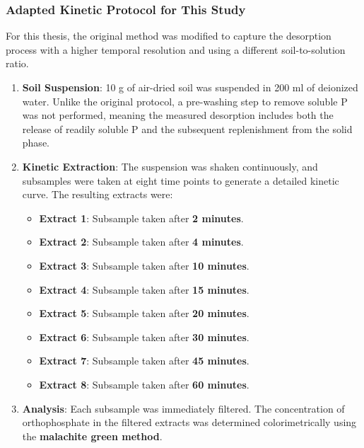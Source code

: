 \documentclass[
  letterpaper,
  DIV=11,
  numbers=noendperiod]{scrartcl}
\providecommand{\tightlist}{%
  \setlength{\itemsep}{0pt}\setlength{\parskip}{0pt}}\usepackage{longtable,booktabs,array}
\begin{document}
\subsubsection{Adapted Kinetic Protocol for This
Study}\label{adapted-kinetic-protocol-for-this-study}

For this thesis, the original method was modified to capture the
desorption process with a higher temporal resolution and using a
different soil-to-solution ratio.

\begin{enumerate}
\def\labelenumi{\arabic{enumi}.}
\item
  \textbf{Soil Suspension}: 10 g of air-dried soil was suspended in 200
  ml of deionized water. Unlike the original protocol, a pre-washing
  step to remove soluble P was not performed, meaning the measured
  desorption includes both the release of readily soluble P and the
  subsequent replenishment from the solid phase.
\item
  \textbf{Kinetic Extraction}: The suspension was shaken continuously,
  and subsamples were taken at eight time points to generate a detailed
  kinetic curve. The resulting extracts were:

  \begin{itemize}
  \tightlist
  \item
    \textbf{Extract 1}: Subsample taken after \textbf{2 minutes}.
  \item
    \textbf{Extract 2}: Subsample taken after \textbf{4 minutes}.
  \item
    \textbf{Extract 3}: Subsample taken after \textbf{10 minutes}.
  \item
    \textbf{Extract 4}: Subsample taken after \textbf{15 minutes}.
  \item
    \textbf{Extract 5}: Subsample taken after \textbf{20 minutes}.
  \item
    \textbf{Extract 6}: Subsample taken after \textbf{30 minutes}.
  \item
    \textbf{Extract 7}: Subsample taken after \textbf{45 minutes}.
  \item
    \textbf{Extract 8}: Subsample taken after \textbf{60 minutes}.
  \end{itemize}
\item
  \textbf{Analysis}: Each subsample was immediately filtered. The
  concentration of orthophosphate in the filtered extracts was
  determined colorimetrically using the \textbf{malachite green method}.
\end{enumerate}
\end{document}
